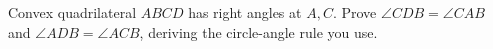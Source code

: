 Convex quadrilateral $ABCD$ has right angles at $A,C$. Prove $\angle CDB=\angle CAB$ and $\angle ADB=\angle ACB$, deriving the circle-angle rule you use.
